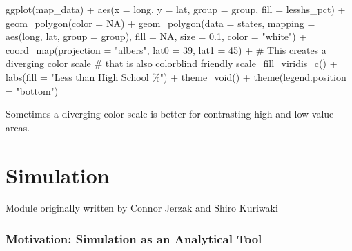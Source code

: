 \documentclass[
  letterpaper,
]{book}
\newenvironment{Shaded}{\begin{snugshade}}{\end{snugshade}}
\newcommand{\AttributeTok}[1]{\textcolor[rgb]{0.40,0.45,0.13}{#1}}
\newcommand{\CommentTok}[1]{\textcolor[rgb]{0.37,0.37,0.37}{#1}}
\newcommand{\ConstantTok}[1]{\textcolor[rgb]{0.56,0.35,0.01}{#1}}
\newcommand{\DecValTok}[1]{\textcolor[rgb]{0.68,0.00,0.00}{#1}}
\newcommand{\FloatTok}[1]{\textcolor[rgb]{0.68,0.00,0.00}{#1}}
\newcommand{\FunctionTok}[1]{\textcolor[rgb]{0.28,0.35,0.67}{#1}}
\newcommand{\NormalTok}[1]{\textcolor[rgb]{0.00,0.23,0.31}{#1}}
\newcommand{\SpecialCharTok}[1]{\textcolor[rgb]{0.37,0.37,0.37}{#1}}
\newcommand{\StringTok}[1]{\textcolor[rgb]{0.13,0.47,0.30}{#1}}
\theoremstyle{definition}
\theoremstyle{definition}
\theoremstyle{plain}
\theoremstyle{definition}
\theoremstyle{plain}
\theoremstyle{plain}
\theoremstyle{remark}
\begin{document}
\begin{Shaded}
\begin{Highlighting}[]
\FunctionTok{ggplot}\NormalTok{(map\_data) }\SpecialCharTok{+}
  \FunctionTok{aes}\NormalTok{(}\AttributeTok{x =}\NormalTok{ long, }\AttributeTok{y =}\NormalTok{ lat, }
      \AttributeTok{group =}\NormalTok{ group, }\AttributeTok{fill =}\NormalTok{ lesshs\_pct) }\SpecialCharTok{+}
  \FunctionTok{geom\_polygon}\NormalTok{(}\AttributeTok{color =} \ConstantTok{NA}\NormalTok{) }\SpecialCharTok{+}
  \FunctionTok{geom\_polygon}\NormalTok{(}\AttributeTok{data =}\NormalTok{ states, }\AttributeTok{mapping =} \FunctionTok{aes}\NormalTok{(long, lat, }\AttributeTok{group =}\NormalTok{ group),}
               \AttributeTok{fill =} \ConstantTok{NA}\NormalTok{, }\AttributeTok{size =} \FloatTok{0.1}\NormalTok{, }\AttributeTok{color =} \StringTok{"white"}\NormalTok{) }\SpecialCharTok{+}
  \FunctionTok{coord\_map}\NormalTok{(}\AttributeTok{projection =} \StringTok{"albers"}\NormalTok{, }\AttributeTok{lat0 =} \DecValTok{39}\NormalTok{, }\AttributeTok{lat1 =} \DecValTok{45}\NormalTok{) }\SpecialCharTok{+}
  \CommentTok{\# This creates a diverging color scale}
  \CommentTok{\# that is also colorblind friendly}
  \FunctionTok{scale\_fill\_viridis\_c}\NormalTok{() }\SpecialCharTok{+}
  \FunctionTok{labs}\NormalTok{(}\AttributeTok{fill =} \StringTok{"Less than High School \%"}\NormalTok{) }\SpecialCharTok{+}
  \FunctionTok{theme\_void}\NormalTok{() }\SpecialCharTok{+}
  \FunctionTok{theme}\NormalTok{(}\AttributeTok{legend.position =} \StringTok{"bottom"}\NormalTok{) }
\end{Highlighting}
\end{Shaded}

Sometimes a diverging color scale is better for contrasting high and low
value areas.

\hypertarget{simulation}{%
\chapter{Simulation}\label{simulation}}

Module originally written by Connor Jerzak and Shiro Kuriwaki

\hypertarget{motivation-simulation-as-an-analytical-tool}{%
\subsection*{Motivation: Simulation as an Analytical
Tool}\label{motivation-simulation-as-an-analytical-tool}}
\end{document}
